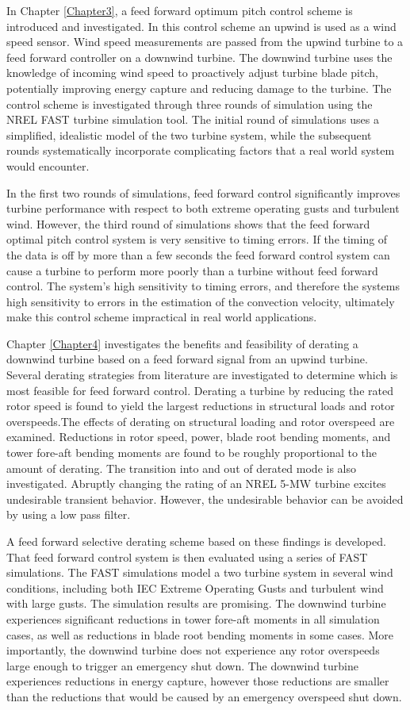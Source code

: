 In Chapter \ref{Chapter3}, a feed forward optimum pitch control scheme is introduced and investigated. In this control scheme an upwind is used as a wind speed sensor. Wind speed measurements are passed from the upwind turbine to a feed forward controller on a downwind turbine. The downwind turbine uses the knowledge of incoming wind speed to proactively adjust turbine blade pitch, potentially improving energy capture and reducing damage to the turbine. The control scheme is investigated through three rounds of simulation using the NREL FAST turbine simulation tool. The initial round of simulations uses a simplified, idealistic model of the two turbine system, while the subsequent rounds systematically incorporate complicating factors that a real world system would encounter.  

In the first two rounds of simulations, feed forward control significantly improves turbine performance with respect to both extreme operating gusts and turbulent wind. However, the third round of simulations shows that the feed forward optimal pitch control system is very sensitive to timing errors. If the timing of the data is off by more than a few seconds the feed forward control system can cause a turbine to perform more poorly than a turbine without feed forward control. The system's high sensitivity to timing errors, and therefore the systems high sensitivity to errors in the estimation of the convection velocity, ultimately make this control scheme impractical in real world applications.

Chapter \ref{Chapter4} investigates the benefits and feasibility of derating a downwind turbine based on a feed forward signal from an upwind turbine. Several derating strategies from literature are investigated to determine which is most feasible for feed forward control. Derating a turbine by reducing the rated rotor speed is found to yield the largest reductions in structural loads and rotor overspeeds.The effects of derating on structural loading and rotor overspeed are examined. Reductions in rotor speed, power, blade root bending moments, and tower fore-aft bending moments are found to be roughly proportional to the amount of derating. The transition into and out of derated mode is also investigated. Abruptly changing the rating of an NREL 5-MW turbine excites undesirable transient behavior. However, the undesirable behavior can be avoided by using a low pass filter. 

A feed forward selective derating scheme based on these findings is developed. That feed forward control system is then evaluated using a series of FAST simulations. The FAST simulations model a two turbine system in several wind conditions, including both IEC Extreme Operating Gusts and turbulent wind with large gusts. The simulation results are promising. The downwind turbine experiences significant reductions in tower fore-aft moments in all simulation cases, as well as reductions in blade root bending moments in some cases. More importantly, the downwind turbine does not experience any rotor overspeeds large enough to trigger an emergency shut down. The downwind turbine experiences reductions in energy capture, however those reductions are smaller than the reductions that would be caused by an emergency overspeed shut down.
  
